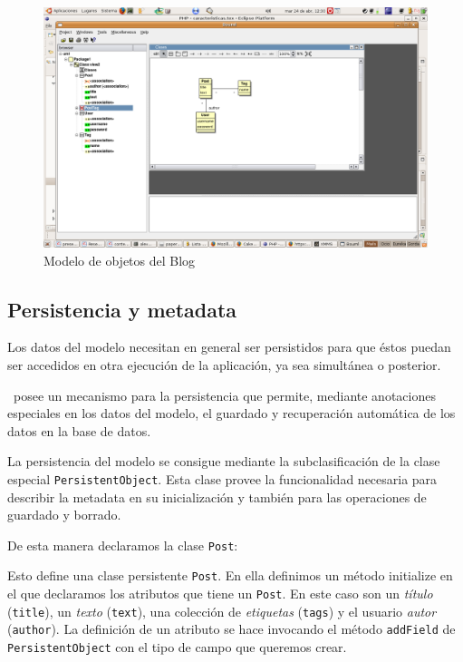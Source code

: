 \begin{figure}[ht]
	\centering
	\includegraphics*[scale=0.50,viewport=420 350 700 600]{images/diagrama.png}
 	\caption{Modelo de objetos del Blog}
 	\label{fig-model1}
\end{figure}


\subsection{Persistencia y metadata}
\label{sub-pers}

Los datos del modelo necesitan en general ser persistidos para que éstos puedan ser accedidos en otra ejecución de la aplicación, ya sea simultánea o posterior.

\PWB \ posee un mecanismo para la persistencia que permite, mediante anotaciones especiales en los datos del modelo, el guardado y recuperación automática de los datos en la base de datos.

La persistencia del modelo se consigue mediante la subclasificación de la clase especial \verb"PersistentObject". Esta clase provee la funcionalidad necesaria para describir la metadata en su inicialización y también para las operaciones de guardado y borrado.

De esta manera declaramos la clase \verb"Post":


Esto define una clase persistente \verb"Post". En ella definimos un método initialize en el que declaramos los atributos que tiene un \verb"Post". En este caso son un \emph{título} (\verb"title"), un \emph{texto} (\verb"text"), una colección de \emph{etiquetas} (\verb"tags") y el usuario \emph{autor} (\verb"author"). La definición de un atributo se hace invocando el método \verb"addField" de \verb"PersistentObject" con el tipo de campo que queremos crear.

